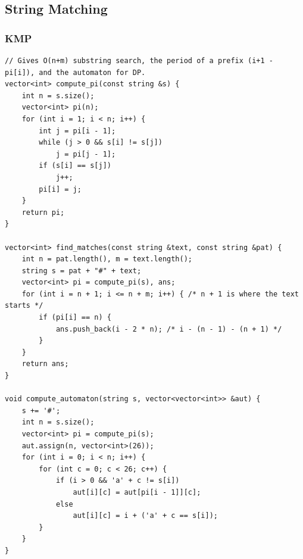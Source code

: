\documentclass[9pt,a4paper,twocolumn]{extarticle}
\begin{document}
\subsection{String Matching}

\filbreak
\subsubsection{KMP}
\nopagebreak
\begin{lstlisting}
// Gives O(n+m) substring search, the period of a prefix (i+1 - pi[i]), and the automaton for DP.
vector<int> compute_pi(const string &s) {
    int n = s.size();
    vector<int> pi(n);
    for (int i = 1; i < n; i++) {
        int j = pi[i - 1];
        while (j > 0 && s[i] != s[j])
            j = pi[j - 1];
        if (s[i] == s[j])
            j++;
        pi[i] = j;
    }
    return pi;
}

vector<int> find_matches(const string &text, const string &pat) {
    int n = pat.length(), m = text.length();
    string s = pat + "#" + text;
    vector<int> pi = compute_pi(s), ans;
    for (int i = n + 1; i <= n + m; i++) { /* n + 1 is where the text starts */
        if (pi[i] == n) {
            ans.push_back(i - 2 * n); /* i - (n - 1) - (n + 1) */
        }
    }
    return ans;
}

void compute_automaton(string s, vector<vector<int>> &aut) {
    s += '#';
    int n = s.size();
    vector<int> pi = compute_pi(s);
    aut.assign(n, vector<int>(26));
    for (int i = 0; i < n; i++) {
        for (int c = 0; c < 26; c++) {
            if (i > 0 && 'a' + c != s[i])
                aut[i][c] = aut[pi[i - 1]][c];
            else
                aut[i][c] = i + ('a' + c == s[i]);
        }
    }
}
\end{lstlisting}

\filbreak
\end{document}
